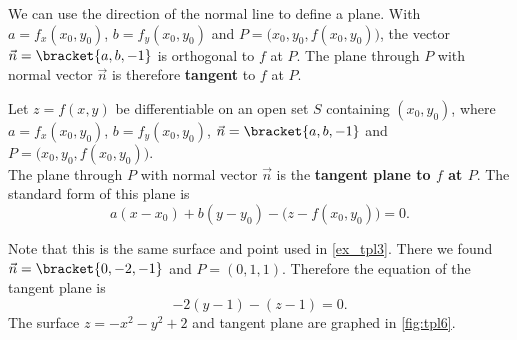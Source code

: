 We can use the direction of the normal line to define a plane. With $a=f_x(x_0,y_0)$, $b=f_y(x_0,y_0)$ and $P = \big(x_0,y_0,f(x_0,y_0)\big)$, the vector $\vec n=\bracket{a,b,-1}$ is orthogonal to $f$ at $P$. The plane through $P$ with normal vector $\vec n$ is therefore \textbf{tangent} to $f$ at $P$.

{Let $z=f(x,y)$ be differentiable on an open set $S$ containing $(x_0,y_0)$, where
$a = f_x(x_0,y_0)$, $b=f_y(x_0,y_0)$, $\vec n=\bracket{a,b,-1}$ and $P=\big(x_0,y_0,f(x_0,y_0)\big)$.\\

The plane through $P$ with normal vector $\vec n$ is the \textbf{tangent plane to $f$ at $P$}. The standard form of this plane is 
$$a(x-x_0) + b(y-y_0) - \big(z-f(x_0,y_0)\big) = 0.$$}

{Note that this is the same surface and point used in \autoref{ex_tpl3}.
%
%
There we found $\vec n =\bracket{0,-2,-1}$ and $P = (0,1,1)$. Therefore the equation of the tangent plane is 
$$-2(y-1)-(z-1)=0.$$
The surface $z=-x^2-y^2+2$ and tangent plane are graphed in \autoref{fig:tpl6}.}

